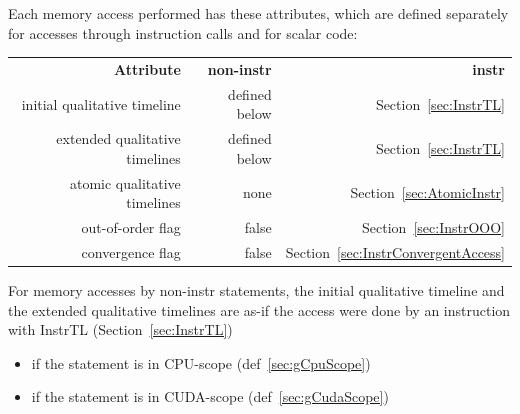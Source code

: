 Each memory access performed has these attributes, which are defined separately for accesses through instruction calls and for scalar code:

\begin{tabular}{|r|r|r|}
\textbf{Attribute} & \textbf{non-instr} & \textbf{instr} \\
initial qualitative timeline & defined below & Section~\ref{sec:InstrTL} \\
extended qualitative timelines & defined below & Section~\ref{sec:InstrTL} \\
atomic qualitative timelines & none & Section~\ref{sec:AtomicInstr} \\
out-of-order flag & false & Section~\ref{sec:InstrOOO} \\
convergence flag & false & Section~\ref{sec:InstrConvergentAccess}
\end{tabular}

For memory accesses by non-instr statements, the initial qualitative timeline and the extended qualitative timelines are as-if the access were done by an instruction with \textsf{InstrTL} (Section~\ref{sec:InstrTL})
\begin{itemize}
  \item {} if the statement is in CPU-scope (def~\ref{sec:gCpuScope})
  \item {} if the statement is in CUDA-scope (def~\ref{sec:gCudaScope})
\end{itemize}

